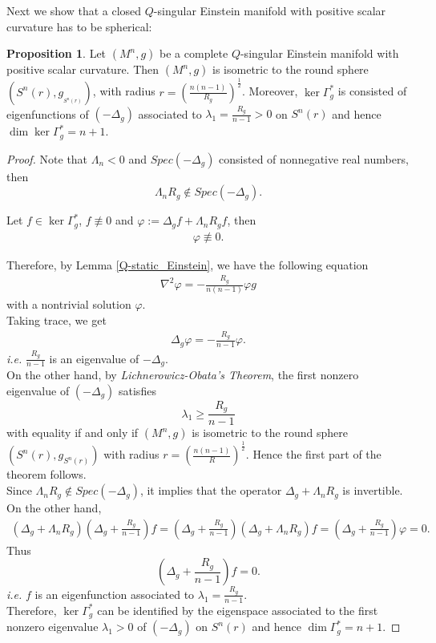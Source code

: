 \documentclass[12pt]{amsart}
\theoremstyle{definition}
\newtheorem{proposition}[theorem]{Proposition}
\theoremstyle{remark}
\numberwithin{equation}{section}
\begin{document}
Next we show that a closed $Q$-singular Einstein manifold with positive scalar curvature has to be spherical:
\begin{proposition} \label{Q-static_sphere}
Let $(M^n,g)$ be a complete $Q$-singular Einstein manifold with positive scalar curvature. Then $(M^n,g)$ is isometric to the round sphere $(S^n(r), g_{_{S^n(r)}})$, with radius $r = \left(\frac{n(n-1)}{R_g}\right)^{\frac{1}{2}}$. Moreover, $\ker \Gamma_g^*$ is consisted of eigenfunctions of $(-\Delta_g)$ associated to $\lambda_1 = \frac{R_g}{n-1}> 0$ on $S^n(r)$ and hence $\dim \ker \Gamma_{g}^* = n+1$.
\end{proposition}

\begin{proof}

Note that $\Lambda_n < 0$ and $Spec (-\Delta_g)$ consisted of nonnegative real numbers, then $$\Lambda_n R_g \not\in Spec ( - \Delta_g).$$

Let $f \in \ker \Gamma_g^*$, $f\not\equiv 0$ and $\varphi := \Delta_g f + \Lambda_n R_g f$, then
\begin{align*}
\varphi \not\equiv 0.
\end{align*}

Therefore, by Lemma \ref{Q-static_Einstein}, we have the following equation
\begin{align}\label{Obata_type_eqn}
\nabla^2\varphi=-\frac{R_g}{n(n-1)}\varphi g
\end{align}
with a nontrivial solution $\varphi$.\\

Taking trace, we get
\begin{align}
\Delta_g \varphi = - \frac{R_g}{n-1}\varphi.
\end{align}
\emph{i.e.} $\frac{R_g}{n-1}$ is an eigenvalue of $-\Delta_g$.\\

On the other hand, by \emph{Lichnerowicz-Obata's Theorem}, the first nonzero eigenvalue of $(- \Delta_g)$ satisfies
$$\lambda_1 \geq \frac{R_g}{n-1}$$
with equality if and only if $(M^n,g)$ is isometric to the round sphere $(S^n(r), g_{S^n(r)})$ with radius $r = \left(\frac{n(n-1)}{R} \right)^{\frac{1}{2}}$. Hence the first part of the theorem follows.\\

Since $\Lambda_n R_g \not\in Spec ( - \Delta_g)$, it implies that the operator $\Delta_g + \Lambda_n R_g$ is invertible. On the other hand,
\begin{align*}
\left( \Delta_g + \Lambda_n R_g \right) \left(\Delta_g + \frac{R_g}{n-1}\right) f = \left(\Delta_g + \frac{R_g}{n-1}\right) \left( \Delta_g + \Lambda_n R_g \right) f = \left(\Delta_g + \frac{R_g}{n-1}\right) \varphi=0.
\end{align*}
Thus $$\left(\Delta_g + \frac{R_g}{n-1}\right) f = 0.$$ \emph{i.e.} $f$ is an eigenfunction associated to $\lambda_1 = \frac{R_g}{n-1}$.\\

Therefore, $\ker \Gamma_g^*$ can be identified by the eigenspace associated to the first nonzero eigenvalue $\lambda_1> 0$ of $(-\Delta_g)$ on $S^n(r)$ and hence $\dim\Gamma_g^* = n+1$.

\end{proof}
\end{document}
